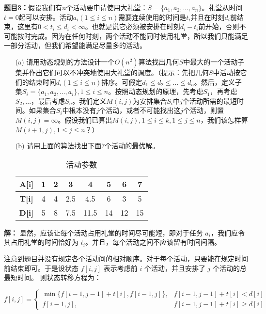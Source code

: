 \documentclass[12pt,a4paper]{ctexart}
\begin{document}
\vspace{10pt}
\noindent
{\bf 题目3：}假设我们有$n$个活动要申请使用大礼堂：$S=\{a_1,a_2,...,a_n\}$。礼堂从时间$t=0$起可以安排。活动$a_i(1 \leq i \leq n)$需要连续使用的时间是$t_i$并且在时刻$d_i$前结束，这里有$0<t_i \leq d_i< \infty$。也就是说它必须被安排在时刻$d_i-t_i$前开始，否则不可能按时完成。因为在任何时刻，两个活动不能同时使用礼堂，所以我们只能满足一部分活动，但我们希望能满足尽量多的活动。
\begin{enumerate}
  \item[(a)]  请用动态规划的方法设计一个$O(n^2)$算法找出几何$S$中最大的一个活动子集并作出它们可以不冲突地使用大礼堂的调度。（提示：先把几何$S$中活动按它们的结束时间$d_i(1 \leq i \leq n)$排序。可假定$d_1 \leq d_2 \leq ... \leq d_n$。然后，定义子集$S_i=\{a_1,a_2,...,a_i\}, 1 \leq i \leq n$。按照动态规划的原理，先考虑$S_1$，再考虑$S_2,...$，最后考虑$S_n$。我们定义$M(i,j)$为安排集合$S_i$中$j$个活动所需的最短时间。如果集合$S_i$中根本没有$j$个活动，或者不可能找出这$j$个活动，则置$M(i,j)= \infty$。假设我们已算出$M(i,j),1 \leq i \leq k, 1 \leq j \leq n$，我们该怎样算$M(i+1,j),1 \leq j \leq n$？）
  \item[(b)]  请用上面的算法找出下面7个活动的最优解。
    \begin{table}[htb]   
    \begin{center}   
    \caption{活动参数}  
    \label{table:1} 
    \begin{tabular}{|c|c|c|c|c|c|c|c|}   
    \hline   \textbf{A[i]} & 1 & 2 & 3 & 4 & 5 & 6 & 7 \\   
    \hline   \textbf{T[i]} & 4 & 4 & 2.5 & 4.5 & 6 & 3 & 5  \\ 
    \hline   \textbf{D[i]} & 5 & 8 & 7.5 & 11.5 & 14 & 12 & 15  \\  
    \hline   
    \end{tabular}   
    \end{center}   
    \end{table}
\end{enumerate}

\textbf{解：} 显然，应该让每个活动占用礼堂的时间尽可能短，即对于任务 $a_i$，我们应令其占用礼堂的时间恰好为 $t_i$。并且，每个活动之间不应该留有时间间隔。

注意到题目并没有规定各个活动间的相对顺序。对于每个活动，只要能在规定时间前结束即可。于是设状态 $f[i, j]$ 表示考虑前 $i$ 个活动，并且安排了 $j$ 个活动的总最短时间。
则状态转移方程为：

\begin{equation}
  f[i, j] = \begin{cases} \label{formula:t3}
    \min\{f[i-1, j-1] + t[i], f[i-1, j]\}, & f[i-1,j-1] + t[i] < d[i] \\
    f[i-1,j], & f[i-1,j-1] + t[i] \geq d[i]
  \end{cases}
\end{equation}
\end{document}
